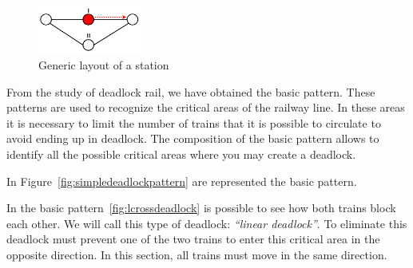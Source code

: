 \documentclass{ewic}
\begin{document}
			\begin{figure}[htp]
				\begin{centering}	
				\includegraphics[width=0.3\textwidth, clip]{img/rappresentazione}
				\caption{Generic layout of a station}
				\label{fig:rappresent}
				\end{centering}
			\end{figure}
			
			
			From the study of deadlock rail, we have obtained the basic pattern.
			These patterns are used to recognize the critical areas of the railway line. In these areas it is necessary to limit the number of trains that it is possible to circulate to avoid ending up in deadlock.
			The composition of the basic pattern allows to identify all the possible critical areas where you may create a deadlock.
			
			In Figure~\ref{fig:simpledeadlockpattern} are represented the basic pattern.
			
			
			In the basic pattern~\ref{fig:lcrossdeadlock} is possible to see how both trains block each other. We will call this type of deadlock: \emph{``linear deadlock''}. To eliminate this deadlock must prevent one of the two trains to enter this critical area in the opposite direction. In this section, all trains must move in the same direction.
			
			
\end{document}

